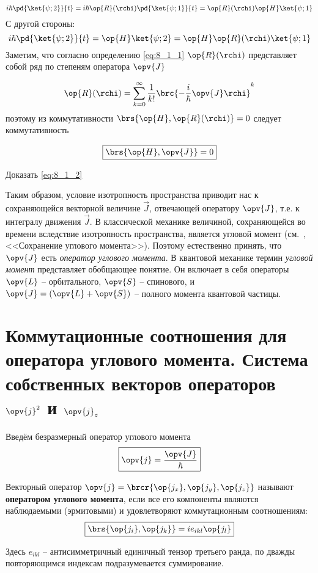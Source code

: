 $$
i\hbar \pd{\ket{\psi;2}}{t} = i\hbar \op{R}(\rchi) \pd{\ket{\psi;1}}{t} = \op{R}(\rchi) \op{H}\ket{\psi;1}
$$%
%
С другой стороны:
$$
i\hbar \pd{\ket{\psi;2}}{t} = \op{H}\ket{\psi;2} = \op{H} \op{R}(\rchi) \ket{\psi;1}
$$%
%
Заметим, что согласно определению \eqref{eq:8_1_1} $\op{R}(\rchi)$ представляет собой ряд по степеням оператора $\opv{J}$

$$
\op{R}(\rchi) = \sum_{k=0}^{\infty} \frac{1}{k!} \brc{- \frac{i}{\hbar} \opv{J} \rchi}^k
$$%
%
поэтому из коммутативности $\brs{\op{H}, \op{R}(\rchi)} = 0$ следует коммутативность

\begin{equation}
\label{eq:8_1_2}
\boxed {
	\brs{\op{H}, \opv{J}} = 0
}
\end{equation}

\begin{excr}
Доказать \eqref{eq:8_1_2}
\end{excr}

Таким образом, условие изотропность пространства приводит нас к сохраняющейся векторной величине $\vec{J}$, отвечающей оператору $\opv{J}$, т.е. к интегралу движения $\vec{J}$. В классической механике величиной, сохраняющейся во времени вследствие изотропность пространства, является угловой момент (см.~, <<Сохранение углового момента>>). Поэтому естественно принять, что $\opv{J}$ есть {\em оператор углового момента}. В квантовой механике термин {\em угловой момент } представляет обобщающее понятие. Он включает в себя операторы $\opv{L}$ -- орбитального, $\opv{S}$ -- спинового, и $\opv{J} = (\opv{L} + \opv{S})$ -- полного момента квантовой частицы.

\begin{sloppypar}
  \section{Коммутационные соотношения для оператора углового момента. Система собственных векторов операторов \texorpdfstring{$\opv{j}^2$ и $\opv{j}_z$}{углового момента}}
\end{sloppypar}

Введём безразмерный оператор углового момента
$$
\boxed{
  \opv{j} = \frac{\opv{J}}{\hbar}
}
$$

\begin{defn}
Векторный оператор $\opv{j} = \brcr{\op{j_x}, \op{j_y}, \op{j_z}}$ называют \textbf{оператором углового момента}, если все его компоненты являются наблюдаемыми (эрмитовыми) и удовлетворяют коммутационным соотношениям:
\begin{equation}
\label{eq:8_2_1}
\boxed {
	\brs{\op{j_i}, \op{j_k}} = i e_{ikl} \op{j_l}
}
\end{equation}
\end{defn}
%
Здесь $e_{ikl}$ -- антисимметричный единичный тензор третьего ранда, по дважды повторяющимся индексам подразумевается суммирование.

